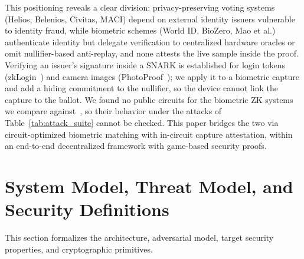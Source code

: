 \documentclass[10pt,letterpaper,journal]{IEEEtran}
\begin{document}
This positioning reveals a clear division: privacy-preserving voting systems (Helios, Belenios, Civitas, MACI) depend on external identity issuers vulnerable to identity fraud, while biometric schemes (World ID, BioZero, Mao et al.) authenticate identity but delegate verification to centralized hardware oracles or omit nullifier-based anti-replay, and none attests the live sample inside the proof. Verifying an issuer's signature inside a SNARK is established for login tokens (zkLogin~\cite{Baldimtsi2024zkLogin}) and camera images (PhotoProof~\cite{Naveh2016PhotoProof}); we apply it to a biometric capture and add a hiding commitment to the nullifier, so the device cannot link the capture to the ballot. We found no public circuits for the biometric ZK systems we compare against~\cite{Lai2024,Mao2023,Mao2025,ZKSeries2025,zkSABER2025}, so their behavior under the attacks of Table~\ref{tab:attack_suite} cannot be checked. This paper bridges the two via circuit-optimized biometric matching with in-circuit capture attestation, within an end-to-end decentralized framework with game-based security proofs.

\section{System Model, Threat Model, and Security Definitions}
\label{sec:system_model}

This section formalizes the architecture, adversarial model, target security properties, and cryptographic primitives.
\end{document}
